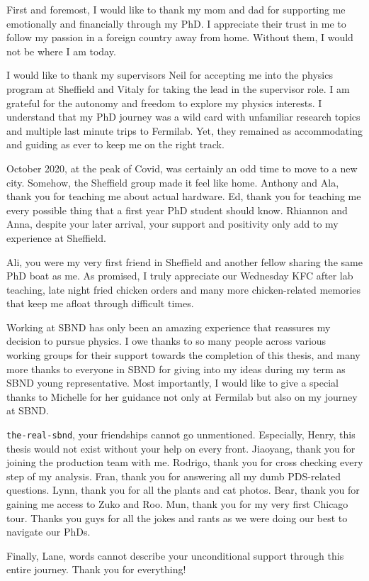 
\begin{acknowledgements}     
First and foremost, I would like to thank my mom and dad for supporting me emotionally and financially through my PhD.
I appreciate their trust in me to follow my passion in a foreign country away from home.
Without them, I would not be where I am today.

I would like to thank my supervisors Neil for accepting me into the physics program at Sheffield and Vitaly for taking the lead in the supervisor role.
I am grateful for the autonomy and freedom to explore my physics interests.
I understand that my PhD journey was a wild card with unfamiliar research topics and multiple last minute trips to Fermilab. 
Yet, they remained as accommodating and guiding as ever to keep me on the right track.

October 2020, at the peak of Covid, was certainly an odd time to move to a new city.
Somehow, the Sheffield group made it feel like home.                                  
Anthony and Ala, thank you for teaching me about actual hardware.
Ed, thank you for teaching me every possible thing that a first year PhD student should know.
Rhiannon and Anna, despite your later arrival, your support and positivity only add to my experience at Sheffield.

Ali, you were my very first friend in Sheffield and another fellow sharing the same PhD boat as me.   
As promised, I truly appreciate our Wednesday KFC after lab teaching, late night fried chicken orders and many more chicken-related memories that keep me afloat through difficult times.
                                                                                                                            
Working at SBND has only been an amazing experience that reassures my decision to pursue physics.
I owe thanks to so many people across various working groups for their support towards the completion of this thesis, and many more thanks to everyone in SBND for giving into my ideas during my term as SBND young representative.
Most importantly, I would like to give a special thanks to Michelle for her guidance not only at Fermilab but also on my journey at SBND.

\texttt{the-real-sbnd}, your friendships cannot go unmentioned.
Especially, Henry, this thesis would not exist without your help on every front.
Jiaoyang, thank you for joining the production team with me.
Rodrigo, thank you for cross checking every step of my analysis.
Fran, thank you for answering all my dumb PDS-related questions.
Lynn, thank you for all the plants and cat photos.
Bear, thank you for gaining me access to Zuko and Roo.
Mun, thank you for my very first Chicago tour.
Thanks you guys for all the jokes and rants as we were doing our best to navigate our PhDs.

Finally, Lane, words cannot describe your unconditional support through this entire journey.
Thank you for everything!                                                                                                                                       
\end{acknowledgements}
